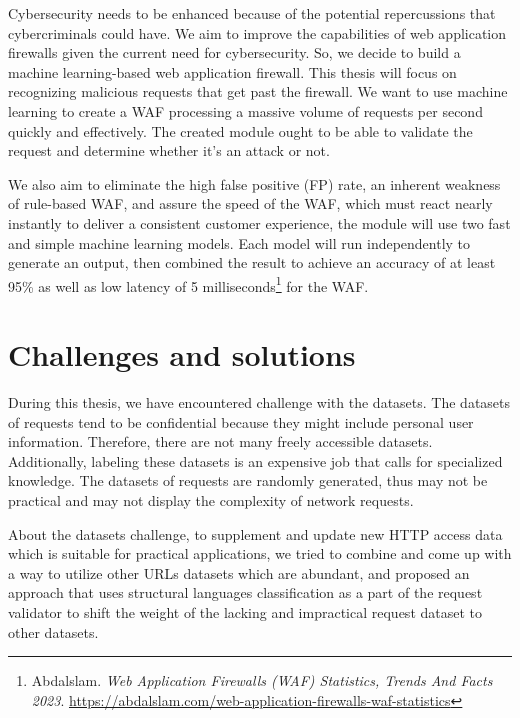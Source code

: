 Cybersecurity needs to be enhanced because of the potential repercussions that cybercriminals could have. We aim to improve the capabilities of web application firewalls given the current need for cybersecurity. So, we decide to build a machine learning-based web application firewall. This thesis will focus on recognizing malicious requests that get past the firewall. We want to use machine learning to create a WAF processing a massive volume of requests per second quickly and effectively. The created module ought to be able to validate the request and determine whether it's an attack or not.

We also aim to eliminate the high false positive (FP) rate, an inherent weakness of rule-based WAF, and assure the speed of the WAF, which must react nearly instantly to deliver a consistent customer experience, the module will use two fast and simple machine learning models. Each model will run independently to generate an output, then combined the result to achieve an accuracy of at least 95\% as well as low latency of 5 milliseconds\footnote{Abdalslam. \textit{Web Application Firewalls (WAF) Statistics, Trends And Facts 2023}. 
\url{https://abdalslam.com/web-application-firewalls-waf-statistics}} for the WAF.

\section{Challenges and solutions}
\label{sec:challenges_and_solutions}
\hspace{0.5cm}During this thesis, we have encountered challenge with the datasets. The datasets of requests tend to be confidential because they might include personal user information. Therefore, there are not many freely accessible datasets. Additionally, labeling these datasets is an expensive job that calls for specialized knowledge. The datasets of requests are randomly generated, thus may not be practical and may not display the complexity of network requests.

About the datasets challenge, to supplement and update new HTTP access data which is suitable for practical applications, we tried to combine and come up with a way to utilize other URLs datasets which are abundant, and proposed an approach that uses structural languages classification as a part of the request validator to shift the weight of the lacking and impractical request dataset to other datasets.
\newpage
